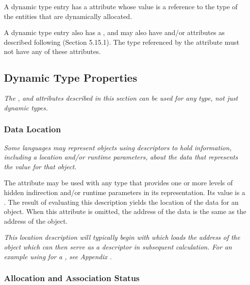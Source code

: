 A dynamic type entry has a \DWATtype{} attribute whose value is a
reference to the type of the entities that are dynamically allocated.
	
A dynamic type entry also has a \DWATdatalocation, and may also
have \DWATallocated{} and/or \DWATassociated{} attributes as 
described following (Section 5.15.1). The type referenced by the
\DWATtype{} attribute must not have any of these attributes.

\subsection{Dynamic Type Properties}
\label{chap:dynamictypeproperties}
\textit{
The \DWATdatalocation, \DWATallocated{} and \DWATassociated{} 
attributes described in this section can be used for any type, not
just dynamic types.}

\subsubsection{Data Location}
\label{chap:datalocation}

\textit{Some languages may represent objects using descriptors to hold
information, including a location and/or run\dash time parameters,
about the data that represents the value for that object.}

\hypertarget{chap:DWATdatalocationindirectiontoactualdata}{}
The \DWATdatalocation{} 
attribute may be used with any
type that provides one or more levels of 
hidden indirection
and/or run\dash time parameters in its representation. Its value
is a . 
The result of evaluating this
description yields the location of the data for an object.
When this attribute is omitted, the address of the data is
the same as the address of the object.

\textit{This location description will typically begin with
\DWOPpushobjectaddress{} 
which loads the address of the
object which can then serve as a descriptor in subsequent
calculation. For an example using 
\DWATdatalocation{} 
for a , see 
Appendix .}

\subsubsection{Allocation and Association Status}
\label{chap:allocationandassociationstatus}

